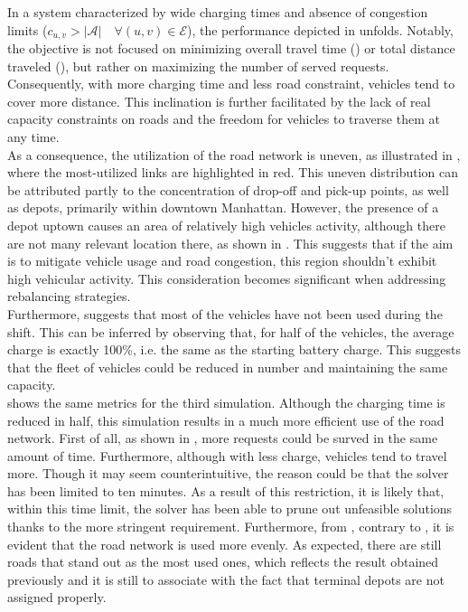In a system characterized by wide charging times and absence of congestion limits ($c_{u,v} > |\mathcal{A}| \quad \forall (u,v) \in \mathcal{E}$), the performance depicted in  unfolds. Notably, the objective is not focused on minimizing overall travel time () or total distance traveled (), but rather on maximizing the number of served requests. Consequently, with more charging time and less road constraint, vehicles tend to cover more distance. This inclination is further facilitated by the lack of real capacity constraints on roads and the freedom for vehicles to traverse them at any time.\\
As a consequence, the utilization of the road network is uneven, as illustrated in , where the most-utilized links are highlighted in red. This uneven distribution can be attributed partly to the concentration of drop-off and pick-up points, as well as depots, primarily within downtown Manhattan. However, the presence of a depot uptown causes an area of relatively high vehicles activity, although there are not many relevant location there, as shown in . This suggests that if the aim is to mitigate vehicle usage and road congestion, this region shouldn't exhibit high vehicular activity. This consideration becomes significant when addressing rebalancing strategies.  \\
Furthermore,  suggests that most of the vehicles have not been used during the shift. This can be inferred by observing that, for half of the vehicles, the average charge is exactly 100\%, i.e. the same as the starting battery charge. This suggests that the fleet of vehicles could  be reduced in number and maintaining the same capacity. \\
 shows the same metrics for the third simulation. Although the charging time is reduced in half, this simulation results in a much more efficient use of the road network. First of all, as shown in , more requests could be surved in the same amount of time. Furthermore, although with less charge, vehicles tend to travel more. Though it may seem counterintuitive, the reason could be that the solver has been limited to ten minutes. As a result of this restriction, it is likely that, within this time limit, the solver has been able to prune out unfeasible solutions thanks to the more stringent requirement. Furthermore, from , contrary to , it is evident that the road network is used more evenly. As expected, there are still roads that stand out as the most used ones, which reflects the result obtained previously and it is still to associate with the fact that terminal depots are not assigned properly. 
